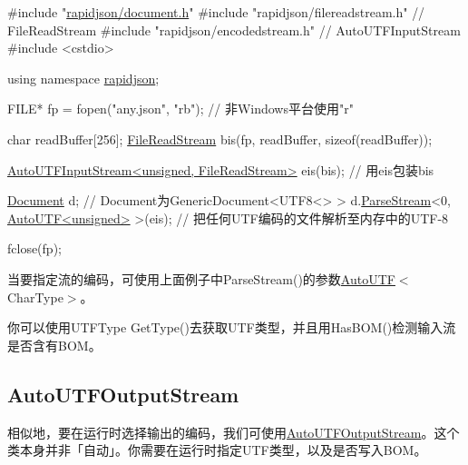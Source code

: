\begin{DoxyCode}
\textcolor{preprocessor}{#include "\hyperlink{document_8h}{rapidjson/document.h}"}
\textcolor{preprocessor}{#include "rapidjson/filereadstream.h"}   \textcolor{comment}{// FileReadStream}
\textcolor{preprocessor}{#include "rapidjson/encodedstream.h"}    \textcolor{comment}{// AutoUTFInputStream}
\textcolor{preprocessor}{#include <cstdio>}

\textcolor{keyword}{using namespace }\hyperlink{namespacerapidjson}{rapidjson};

FILE* fp = fopen(\textcolor{stringliteral}{"any.json"}, \textcolor{stringliteral}{"rb"}); \textcolor{comment}{// 非Windows平台使用"r"}

\textcolor{keywordtype}{char} readBuffer[256];
\hyperlink{class_file_read_stream}{FileReadStream} bis(fp, readBuffer, \textcolor{keyword}{sizeof}(readBuffer));

\hyperlink{class_auto_u_t_f_input_stream}{AutoUTFInputStream<unsigned, FileReadStream>} eis(bis);  \textcolor{comment}{//
       用eis包装bis}

\hyperlink{class_generic_document}{Document} d;         \textcolor{comment}{// Document为GenericDocument<UTF8<> > }
d.\hyperlink{class_generic_document_afe94c0abc83a20f2d7dc1ba7677e6238}{ParseStream}<0, \hyperlink{struct_auto_u_t_f}{AutoUTF<unsigned>} >(eis); \textcolor{comment}{// 把任何UTF编码的文件解析至内存中的UTF-8}

fclose(fp);
\end{DoxyCode}


当要指定流的编码，可使用上面例子中{\ttfamily Parse\+Stream()}的参数{\ttfamily \hyperlink{struct_auto_u_t_f}{Auto\+U\+TF}$<$Char\+Type$>$}。

你可以使用{\ttfamily U\+T\+F\+Type Get\+Type()}去获取\+U\+T\+F类型，并且用{\ttfamily Has\+B\+O\+M()}检测输入流是否含有\+B\+O\+M。\hypertarget{md_Cadriciel_Commun_Externe_RapidJSON_doc_stream.zh-cn_AutoUTFOutputStream}{}\subsection{Auto\+U\+T\+F\+Output\+Stream}\label{md_Cadriciel_Commun_Externe_RapidJSON_doc_stream.zh-cn_AutoUTFOutputStream}
相似地，要在运行时选择输出的编码，我们可使用{\ttfamily \hyperlink{class_auto_u_t_f_output_stream}{Auto\+U\+T\+F\+Output\+Stream}}。这个类本身并非「自动」。你需要在运行时指定\+U\+T\+F类型，以及是否写入\+B\+O\+M。


